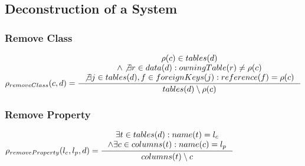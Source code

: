\documentclass[11pt]{article}
\begin{document}
\subsection{Deconstruction of a System}
\subsubsection{Remove Class}
$
\rho_{removeClass}(c,d) = \inference{\rho(c) \in tables(d) \\ \wedge \not \exists r \in data(d) : owningTable(r) \neq \rho(c) \\ \not \exists j \in tables(d), f \in foreignKeys(j) : reference(f) = \rho(c)  }{tables(d) \setminus \rho(c)}
$

\subsubsection{Remove Property}
$
\rho_{removeProperty}(l_c, l_p, d) = \inference{\exists t \in tables(d) : name(t) = l_c \\ \wedge \exists c \in columns(t) : name(c) = l_p }{
columns(t) \setminus c
}
$


	
\end{document}
